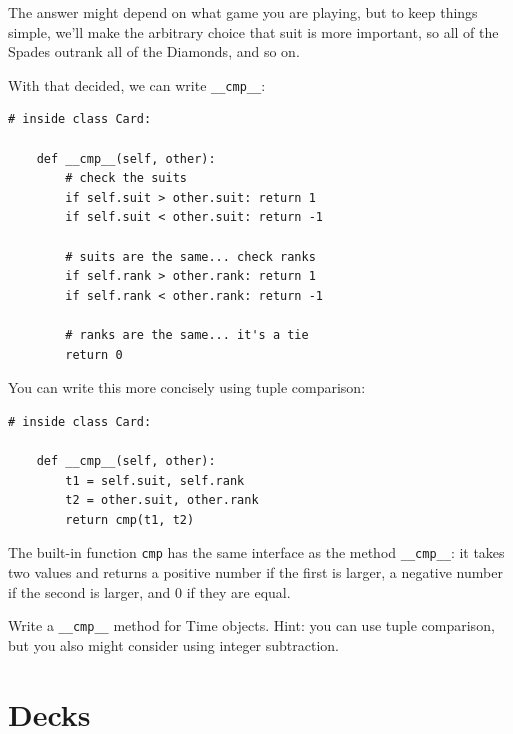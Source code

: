 \documentclass[10pt]{book}
\begin{document}
\begin{CJK}{UTF8}{gbsn}
The answer might depend on what game you are playing, but to keep
things simple, we'll make the arbitrary choice that suit is more
important, so all of the Spades outrank all of the Diamonds,
and so on.

With that decided, we can write \verb"__cmp__":

\begin{verbatim}
# inside class Card:

    def __cmp__(self, other):
        # check the suits
        if self.suit > other.suit: return 1
        if self.suit < other.suit: return -1

        # suits are the same... check ranks
        if self.rank > other.rank: return 1
        if self.rank < other.rank: return -1

        # ranks are the same... it's a tie
        return 0    
\end{verbatim}
%
You can write this more concisely using tuple comparison:

\begin{verbatim}
# inside class Card:

    def __cmp__(self, other):
        t1 = self.suit, self.rank
        t2 = other.suit, other.rank
        return cmp(t1, t2)
\end{verbatim}
%
The built-in function {\tt cmp} has the same interface as
the method \verb"__cmp__": it takes two values and returns
a positive number if the first is larger, a negative number
if the second is larger, and 0 if they are equal.


\begin{exercise}

Write a \verb"__cmp__" method for Time objects.  Hint: you
can use tuple comparison, but you also might consider using
integer subtraction.



\end{exercise}


\section{Decks}


\end{CJK}
\end{document}
